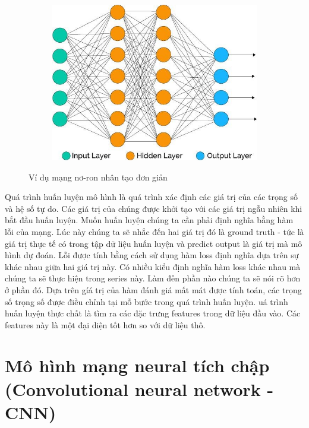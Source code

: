 \begin{figure}
    \begin{subfigure}{0.6\textwidth}
        \includegraphics[width=1.0\linewidth]{Chapters/items/ann.jpg}
        \caption{}
        \label{fig: ann}
    \end{subfigure}
    \caption{Ví dụ mạng nơ-ron nhân tạo đơn giản}
\end{figure}


Quá trình huấn luyện mô hình là quá trình xác định các giá trị của
các trọng số và hệ số tự do. Các giá trị của chúng được khởi tạo với
các giá trị ngẫu nhiên khi bắt đầu huấn luyện. Muốn huấn luyện chúng
ta cần phải định nghĩa bằng hàm lỗi của mạng. Lúc này chúng ta
sẽ nhắc đến hai giá trị đó là ground truth - tức là giá trị
thực tế có trong tập dữ liệu huấn luyện và predict output là
giá trị mà mô hình dự đoán. Lỗi được tính bằng cách sử dụng
hàm loss định nghĩa dựa trên sự khác nhau giữa hai giá trị này.
Có nhiều kiểu định nghĩa hàm loss khác nhau mà chúng ta sẽ thực
hiện trong series này. Làm đến phần nào chúng ta sẽ nói rõ hơn ở
phần đó. Dựa trên gíá trị của hàm đánh giá mất mát được tính toán, các trọng
số trọng số được điều chỉnh tại mỗ bước trong quá trình huấn luyện.
uá trình huấn luyện thực chất là tìm ra các đặc trưng features trong
dữ liệu đầu vào. Các features này là một đại diện tốt hơn so với dữ
liệu thô.


\section{Mô hình mạng neural tích chập (Convolutional neural network - CNN)}

